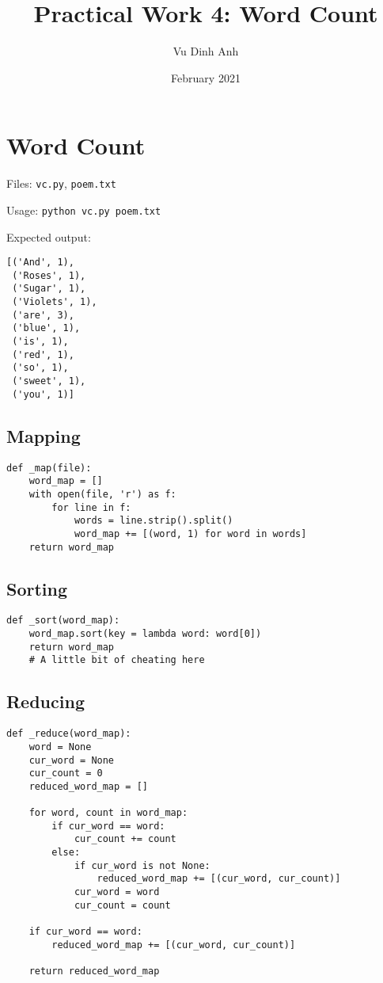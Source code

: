 \documentclass{article}
\title{Practical Work 4: Word Count}
\author{Vu Dinh Anh}
\date{February 2021}
\begin{document}
\maketitle

\section*{Word Count}

Files: \texttt{vc.py}, \texttt{poem.txt}

Usage: \texttt{python vc.py poem.txt}

Expected output:
\begin{verbatim}
[('And', 1),
 ('Roses', 1),
 ('Sugar', 1),
 ('Violets', 1),
 ('are', 3),
 ('blue', 1),
 ('is', 1),
 ('red', 1),
 ('so', 1),
 ('sweet', 1),
 ('you', 1)]
\end{verbatim}

\subsection*{Mapping}

\begin{verbatim}
def _map(file):
    word_map = []
    with open(file, 'r') as f:
        for line in f:
            words = line.strip().split()
            word_map += [(word, 1) for word in words]  
    return word_map
\end{verbatim}

\subsection*{Sorting}

\begin{verbatim}
def _sort(word_map):
    word_map.sort(key = lambda word: word[0])
    return word_map
    # A little bit of cheating here
\end{verbatim}

\subsection*{Reducing}

\begin{verbatim}
def _reduce(word_map):
    word = None
    cur_word = None
    cur_count = 0
    reduced_word_map = []

    for word, count in word_map:
        if cur_word == word:
            cur_count += count
        else:
            if cur_word is not None:
                reduced_word_map += [(cur_word, cur_count)]
            cur_word = word
            cur_count = count

    if cur_word == word:
        reduced_word_map += [(cur_word, cur_count)]

    return reduced_word_map
\end{verbatim}
\end{document}

